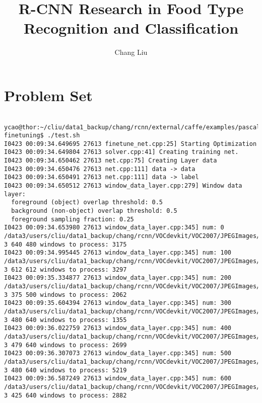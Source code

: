 \documentclass[a4]{article}
\title{R-CNN Research in Food Type Recognition and Classification}
\author{Chang Liu}
\begin{document}
\maketitle

\tableofcontents

\newpage

\section{Problem Set}


\begin{lstlisting}

ycao@thor:~/cliu/data1_backup/chang/rcnn/external/caffe/examples/pascal-finetuning$ ./test.sh 
I0423 00:09:34.649695 27613 finetune_net.cpp:25] Starting Optimization
I0423 00:09:34.649804 27613 solver.cpp:41] Creating training net.
I0423 00:09:34.650462 27613 net.cpp:75] Creating Layer data
I0423 00:09:34.650476 27613 net.cpp:111] data -> data
I0423 00:09:34.650491 27613 net.cpp:111] data -> label
I0423 00:09:34.650512 27613 window_data_layer.cpp:279] Window data layer:
  foreground (object) overlap threshold: 0.5
  background (non-object) overlap threshold: 0.5
  foreground sampling fraction: 0.25
I0423 00:09:34.653980 27613 window_data_layer.cpp:345] num: 0 /data3/users/cliu/data1_backup/chang/rcnn/VOCdevkit/VOC2007/JPEGImages/COCO_val2014_000000015953.jpg 3 640 480 windows to process: 3175
I0423 00:09:34.995445 27613 window_data_layer.cpp:345] num: 100 /data3/users/cliu/data1_backup/chang/rcnn/VOCdevkit/VOC2007/JPEGImages/COCO_val2014_000000067686.jpg 3 612 612 windows to process: 3297
I0423 00:09:35.334877 27613 window_data_layer.cpp:345] num: 200 /data3/users/cliu/data1_backup/chang/rcnn/VOCdevkit/VOC2007/JPEGImages/COCO_val2014_000000134278.jpg 3 375 500 windows to process: 2062
I0423 00:09:35.604394 27613 window_data_layer.cpp:345] num: 300 /data3/users/cliu/data1_backup/chang/rcnn/VOCdevkit/VOC2007/JPEGImages/COCO_val2014_000000206579.jpg 3 480 640 windows to process: 1355
I0423 00:09:36.022759 27613 window_data_layer.cpp:345] num: 400 /data3/users/cliu/data1_backup/chang/rcnn/VOCdevkit/VOC2007/JPEGImages/COCO_val2014_000000265822.jpg 3 479 640 windows to process: 2699
I0423 00:09:36.307073 27613 window_data_layer.cpp:345] num: 500 /data3/users/cliu/data1_backup/chang/rcnn/VOCdevkit/VOC2007/JPEGImages/COCO_val2014_000000331817.jpg 3 480 640 windows to process: 5219
I0423 00:09:36.587249 27613 window_data_layer.cpp:345] num: 600 /data3/users/cliu/data1_backup/chang/rcnn/VOCdevkit/VOC2007/JPEGImages/COCO_val2014_000000409346.jpg 3 425 640 windows to process: 2882

\end{lstlisting}
\end{document}

